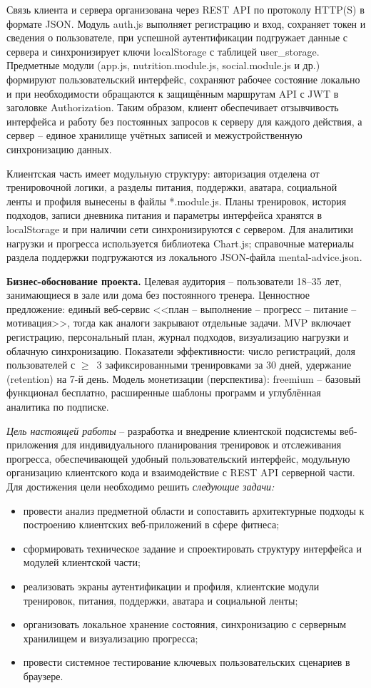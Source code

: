 Связь клиента и сервера организована через REST API по протоколу HTTP(S) в формате JSON. Модуль auth.js выполняет регистрацию и вход, сохраняет токен и сведения о пользователе, при успешной аутентификации подгружает данные с сервера и синхронизирует ключи localStorage с таблицей user\_storage. Предметные модули (app.js, nutrition.module.js, social.module.js и др.) формируют пользовательский интерфейс, сохраняют рабочее состояние локально и при необходимости обращаются к защищённым маршрутам API с JWT в заголовке Authorization. Таким образом, клиент обеспечивает отзывчивость интерфейса и работу без постоянных запросов к серверу для каждого действия, а сервер -- единое хранилище учётных записей и межустройственную синхронизацию данных.

Клиентская часть имеет модульную структуру: авторизация отделена от тренировочной логики, а разделы питания, поддержки, аватара, социальной ленты и профиля вынесены в файлы *.module.js. Планы тренировок, история подходов, записи дневника питания и параметры интерфейса хранятся в localStorage и при наличии сети синхронизируются с сервером. Для аналитики нагрузки и прогресса используется библиотека Chart.js; справочные материалы раздела поддержки подгружаются из локального JSON-файла mental-advice.json.

\textbf{Бизнес-обоснование проекта.} Целевая аудитория -- пользователи 18--35 лет, занимающиеся в зале или дома без постоянного тренера. Ценностное предложение: единый веб-сервис <<план -- выполнение -- прогресс -- питание -- мотивация>>, тогда как аналоги закрывают отдельные задачи. MVP включает регистрацию, персональный план, журнал подходов, визуализацию нагрузки и облачную синхронизацию. Показатели эффективности: число регистраций, доля пользователей с $\geq$~3 зафиксированными тренировками за 30 дней, удержание (retention) на 7-й день. Модель монетизации (перспектива): freemium -- базовый функционал бесплатно, расширенные шаблоны программ и углублённая аналитика по подписке.

\emph{Цель настоящей работы} -- разработка и внедрение клиентской подсистемы веб-приложения для индивидуального планирования тренировок и отслеживания прогресса, обеспечивающей удобный пользовательский интерфейс, модульную организацию клиентского кода и взаимодействие с REST API серверной части. Для достижения цели необходимо решить \emph{следующие задачи:}
\begin{itemize}
\item провести анализ предметной области и сопоставить архитектурные подходы к построению клиентских веб-приложений в сфере фитнеса;
\item сформировать техническое задание и спроектировать структуру интерфейса и модулей клиентской части;
\item реализовать экраны аутентификации и профиля, клиентские модули тренировок, питания, поддержки, аватара и социальной ленты;
\item организовать локальное хранение состояния, синхронизацию с серверным хранилищем и визуализацию прогресса;
\item провести системное тестирование ключевых пользовательских сценариев в браузере.
\end{itemize}

